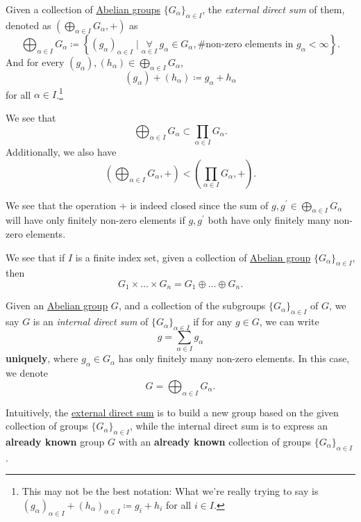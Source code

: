 \begin{definition}\label{def:external-direct-sum}
	Given a collection of \hyperref[def:Abelian-group]{Abelian groups} \(\{G_\alpha \}_{\alpha \in I}\), the \emph{external direct sum} of them, denoted as \(\left(\bigoplus_{\alpha \in I} G_\alpha , +\right)\)
	as
	\[
		\bigoplus_{\alpha \in I}G_\alpha \coloneqq \left\{(g_\alpha )_{\alpha \in I}\mid \underset{\alpha \in I}{\forall }\ g_\alpha \in G_\alpha, \text{\# non-zero elements in \(g_{\alpha} < \infty\)}\right\}.
	\]
	And for every \((g_\alpha ), (h_\alpha )\in \bigoplus_{\alpha \in I}G_\alpha \),
	\[
		(g_\alpha )+(h_\alpha )\coloneqq g_\alpha +h_\alpha
	\]
	for all \(\alpha \in I\).\footnote{This may not be the best notation: What we're really trying to say is \((g_\alpha )_{\alpha \in I}+ (h_\alpha )_{\alpha \in I} \coloneqq g_i + h_i \) for all \(i \in I\).}
\end{definition}
\begin{note}
	We see that
	\[
		\bigoplus_{\alpha \in I}G_\alpha \subset \prod\limits_{\alpha \in I}G_\alpha.
	\]
	Additionally, we also have
	\[
		\left(\bigoplus_{\alpha \in I}G_\alpha , +\right)< \left(\prod\limits_{\alpha \in I}G_\alpha , +\right).
	\]
\end{note}
\begin{remark}
	We see that the operation \(+\) is indeed closed since the sum of \(g, g^\prime \in \bigoplus_{\alpha \in I} G_\alpha \) will have only finitely non-zero elements if
	\(g, g^\prime \) both have only finitely many non-zero elements.
\end{remark}

We see that if \(I\) is a finite index set, given a collection of \hyperref[def:Abelian-group]{Abelian group} \(\{G_\alpha \}_{\alpha \in I}\), then
\[
	G_1 \times \ldots \times G_n = G_{1}  \oplus  \ldots \oplus G_n.
\]

\begin{definition}\label{def:internal-direct-sum}
	Given an \hyperref[def:Abelian-group]{Abelian group} \(G\), and a collection of the subgroups \(\{G_\alpha \}_{\alpha \in I}\) of \(G\), we say \(G\) is an \emph{internal direct sum}
	of \(\{G_\alpha \}_{\alpha \in I}\) if for any \(g\in G\), we can write
	\[
		g = \sum\limits_{\alpha \in I} g_\alpha
	\]
	\textbf{uniquely}, where \(g_\alpha \in G_\alpha \) has only finitely many non-zero elements. In this case, we denote
	\[
		G = \bigoplus_{\alpha \in I}G_\alpha .
	\]
\end{definition}
Intuitively, the \hyperref[def:external-direct-sum]{external direct sum} is to build a new group based on the given collection of groups \(\{G_\alpha \}_{\alpha \in I}\), while the internal direct sum is
to express an \textbf{already known} group \(G\) with an \textbf{already known} collection of groups \(\{G_\alpha \}_{\alpha \in I}\).

